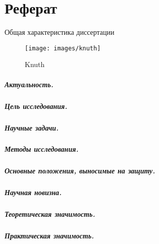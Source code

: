 \renewcommand{\figurename}{Рисунок}
\renewcommand{\tablename}{Таблица}
\renewcommand\thesubfigure{\asbuk{subfigure}}

\chapter*{Реферат}

\begin{center}
    Общая характеристика диссертации
\end{center}

\begin{figure}
    \centering
    \texttt{[image: images/knuth]}
    \caption{Knuth}
    \label{fig:my_label2}
\end{figure}


\paragraph*{Актуальность.}

\paragraph*{Цель исследования.}
\paragraph*{Научные задачи.}

\paragraph*{Методы исследования.}


\paragraph*{Основные положения, выносимые на защиту.}

\paragraph*{Научная новизна.}

\paragraph*{Теоретическая значимость.}
\paragraph*{Практическая значимость.}
